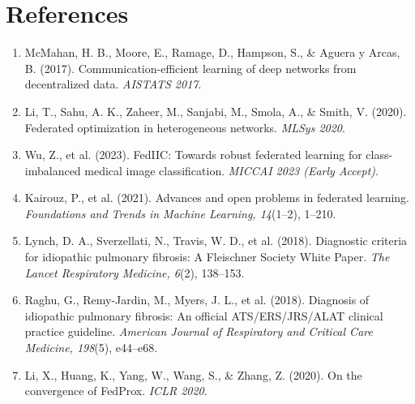 \documentclass[12pt,a4paper]{report}
\begin{document}
\newpage

\chapter*{References}

\begin{enumerate}
    \item McMahan, H. B., Moore, E., Ramage, D., Hampson, S., \& Aguera y Arcas, B. (2017). Communication-efficient learning of deep networks from decentralized data. \textit{AISTATS 2017}.

    \item Li, T., Sahu, A. K., Zaheer, M., Sanjabi, M., Smola, A., \& Smith, V. (2020). Federated optimization in heterogeneous networks. \textit{MLSys 2020}.

    \item Wu, Z., et al. (2023). FedIIC: Towards robust federated learning for class-imbalanced medical image classification. \textit{MICCAI 2023 (Early Accept)}.

    \item Kairouz, P., et al. (2021). Advances and open problems in federated learning. \textit{Foundations and Trends in Machine Learning, 14}(1--2), 1--210.

    \item Lynch, D. A., Sverzellati, N., Travis, W. D., et al. (2018). Diagnostic criteria for idiopathic pulmonary fibrosis: A Fleischner Society White Paper. \textit{The Lancet Respiratory Medicine, 6}(2), 138--153.

    \item Raghu, G., Remy-Jardin, M., Myers, J. L., et al. (2018). Diagnosis of idiopathic pulmonary fibrosis: An official ATS/ERS/JRS/ALAT clinical practice guideline. \textit{American Journal of Respiratory and Critical Care Medicine, 198}(5), e44--e68.

    \item Li, X., Huang, K., Yang, W., Wang, S., \& Zhang, Z. (2020). On the convergence of FedProx. \textit{ICLR 2020}.
\end{enumerate}
\end{document}
